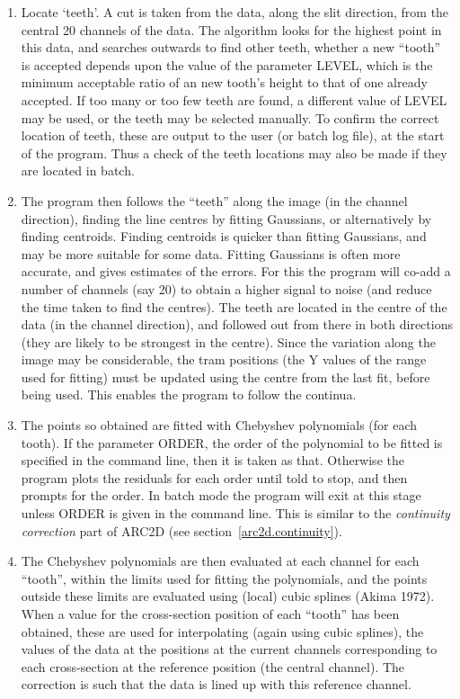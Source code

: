 \begin{enumerate}

\item Locate `teeth'. A cut is taken from the data, along the slit
direction, from the central 20 channels of the data.  The algorithm
looks for the highest point in this data, and searches outwards to find
other teeth, whether a new ``tooth'' is accepted depends upon the value
of the parameter LEVEL, which is the minimum acceptable ratio of an new
tooth's height to that of one already accepted. If too many or too few
teeth are found, a different value of LEVEL may be used, or the teeth
may be selected manually. To confirm the correct location of teeth,
these are output to the user (or batch log file), at the start of the
program. Thus a check of the teeth locations may also be made if they
are located in batch.

\item The program then follows the ``teeth'' along the image (in the
channel direction), finding the line centres by fitting Gaussians, or
alternatively by finding centroids. Finding centroids is quicker than
fitting Gaussians, and may be more suitable for some data. Fitting
Gaussians is often more accurate, and gives estimates of the errors.
For this the program will co-add a number of channels (say 20) to
obtain a higher signal to noise (and reduce the time taken to find the
centres).  The teeth are located in the centre of the data (in the
channel direction), and followed out from there in both directions
(they are likely to be strongest in the centre).  Since the variation
along the image may be considerable, the tram positions (the Y values
of the range used for fitting) must be updated using the centre from
the last fit, before being used.  This enables the program to follow
the continua.

\item The points so obtained are fitted with Chebyshev polynomials (for
each tooth). If the parameter ORDER, the order of the polynomial to be
fitted is specified in the command line, then it is taken as that.
Otherwise the program plots the residuals for each order until told to
stop, and then prompts for the order.  In batch mode the program will
exit at this stage unless ORDER is given in the command line.  This is
similar to the {\em continuity correction} part of ARC2D (see
section~\ref{arc2d.continuity}).

\item The Chebyshev polynomials are then evaluated at each channel for
each ``tooth'', within the limits used for fitting the polynomials, and
the points outside these limits are evaluated using (local) cubic
splines (Akima 1972). When a value for the cross-section position of
each ``tooth'' has been obtained, these are used for interpolating
(again using cubic splines), the values of the data at the positions at
the current channels corresponding to each cross-section at the
reference position (the central channel). The correction is such that
the data is lined up with this reference channel.

\end{enumerate}

